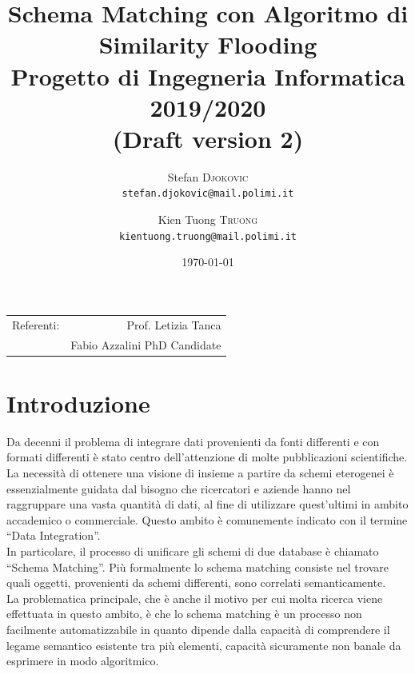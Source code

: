 \documentclass[a4paper,10pt]{article}
\title{Schema Matching con Algoritmo di Similarity Flooding \\ Progetto di Ingegneria Informatica 2019/2020\\
\large (Draft version 2)} %
\author{Stefan \textsc{Djokovic} \\
	\texttt{stefan.djokovic@mail.polimi.it}
	\and Kien Tuong \textsc{Truong} \\
	\texttt{kientuong.truong@mail.polimi.it}} %
\date{\today} %
\begin{document}
\maketitle %

\begin{center}
\begin{tabular}{l r}
Referenti: & Prof. Letizia Tanca\\ %
& Fabio Azzalini PhD Candidate
\end{tabular}
\end{center}



\section{Introduzione}

Da decenni il problema di integrare dati provenienti da fonti differenti e con formati differenti è stato centro dell’attenzione di molte pubblicazioni scientifiche. La necessità di ottenere una visione di insieme a partire da schemi eterogenei è essenzialmente guidata dal bisogno che ricercatori e aziende hanno nel raggruppare una vasta quantità di dati, al fine di utilizzare quest’ultimi in ambito accademico o commerciale. Questo ambito è comunemente indicato con il termine “Data Integration”.\\

In particolare, il processo di unificare gli schemi di due database è chiamato “Schema Matching”. Più formalmente lo schema matching consiste nel trovare quali oggetti, provenienti da schemi differenti, sono correlati semanticamente.\\

La problematica principale, che è anche il motivo per cui molta ricerca viene effettuata in questo ambito, è che lo schema matching è un processo non facilmente automatizzabile in quanto dipende dalla capacità di comprendere il legame semantico esistente tra più elementi, capacità sicuramente non banale da esprimere in modo algoritmico.\\
\end{document}
